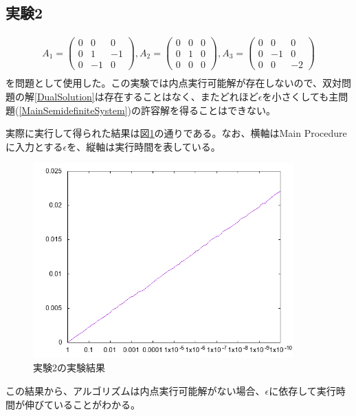 \subsection{実験2}
\begin{align*}
  A_1 = \left(
            \begin{array}{ccc}
              0 &  0 &  0 \\
              0 &  1 & -1 \\
              0 & -1 &  0
            \end{array}
          \right),
  A_2 = \left(
            \begin{array}{ccc}
              0 & 0 & 0 \\
              0 & 1 & 0 \\
              0 & 0 & 0
            \end{array}
          \right),
  A_3 = \left(
            \begin{array}{ccc}
              0 &  0 &  0 \\
              0 & -1 &  0 \\
              0 &  0 & -2
            \end{array}
          \right) \\
\end{align*}
を問題として使用した。この実験では内点実行可能解が存在しないので、双対問題の解\ref{DualSolution}は存在することはなく、またどれほど$\epsilon$を小さくしても主問題(\ref{MainSemidefiniteSystem})の許容解を得ることはできない。

実際に実行して得られた結果は図\ref{test2}の通りである。なお、横軸はMain Procedureに入力とする$\epsilon$を、縦軸は実行時間を表している。
\begin{figure}
  \centering
  \includegraphics[width=10cm]{test2.png}
  \caption{実験2の実験結果}
  \label{test2}
\end{figure}
この結果から、アルゴリズムは内点実行可能解がない場合、$\epsilon$に依存して実行時間が伸びていることがわかる。

